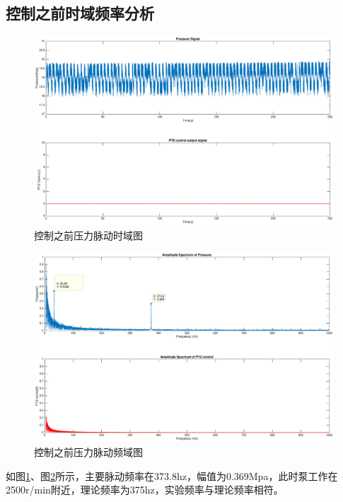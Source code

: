 \documentclass[12pt]{article}
\begin{document}
\subsection{控制之前时域频率分析}

\begin{figure}[H]
\begin{center}
\includegraphics[width=0.9\linewidth]{./images/time_domain_result_before_control.eps}
\caption{控制之前压力脉动时域图}
\label{fig:fig8}
\end{center}
\end{figure}

\begin{figure}[H]
\begin{center}
\includegraphics[width=0.9\linewidth]{./images/fft_result_before_control.eps}
\caption{控制之前压力脉动频域图}
\label{fig:fig9}
\end{center}
\end{figure}

如图\ref{fig:fig8}、图\ref{fig:fig9}所示，主要脉动频率在373.8hz，幅值为0.369Mpa，此时泵工作在2500r/min附近，理论频率为375hz，实验频率与理论频率相符。
\end{document}
